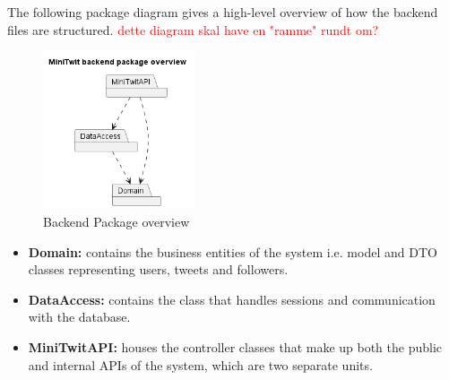 The following package diagram gives a high-level overview of how the backend files are structured.
\textcolor{red}{dette diagram skal have en "ramme" rundt om?}
\begin{figure}[H]
 \centering
 \includegraphics[width = 0.4\textwidth]{Images/backend_package_overview.png}
 \caption{Backend Package overview}
 \label{fig:BackendPackageDiagram}
\end{figure}
\begin{itemize}
    \item \textbf{Domain:} contains the business entities of the system i.e. model and DTO classes representing users, tweets and followers.
    \item \textbf{DataAccess:} contains the class that handles sessions and communication with the database.
    \item \textbf{MiniTwitAPI:} houses the controller classes that make up both the public and internal APIs of the system, which are two separate units. 
\end{itemize}


